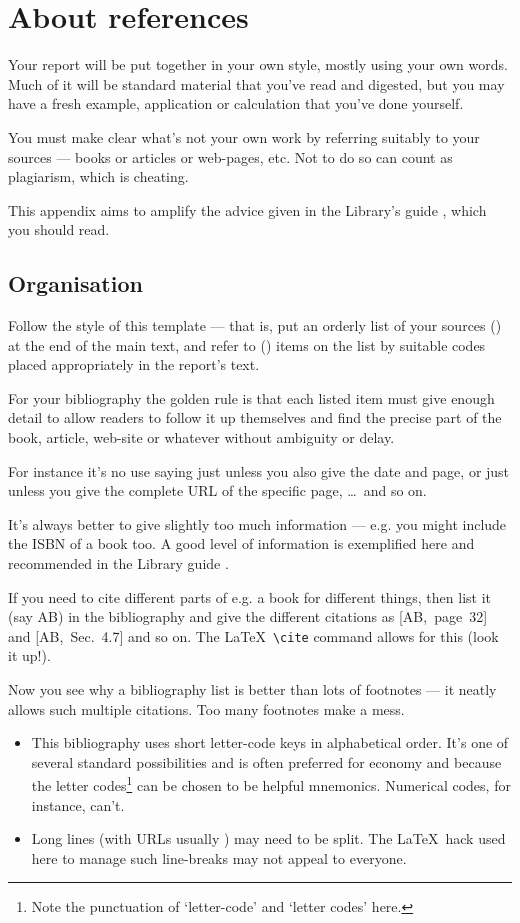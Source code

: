 \chapter{About references}\label{app:refs}
Your report will be put together in your own style, mostly using your
own words. Much of it will be standard material that you've read and
digested, but you may have a fresh example, application or calculation
that you've done yourself.
\par
You must make clear what's not your own work by referring suitably
to your sources --- books or articles or web-pages, etc. Not to do so
can count as plagiarism, which is cheating.
\par
This appendix aims to amplify the advice given in the
Library's guide \cite{BR}, which you should read.
\section{Organisation}
Follow the style of this template --- that is, put an orderly list of
your sources () at the end of the main text,
and refer to () items on the list by suitable codes placed
appropriately in the report's text.
\par
For your bibliography the golden rule is that each listed item must give
enough detail to allow readers to follow it up themselves and find the
precise part of the book, article, web-site or whatever without
ambiguity or delay.
\par
For instance it's no use saying just  unless
you also give the date and page, or just  unless you
give the complete URL of the specific page, \dots\ and so on.
\par
It's always better to give slightly too much information --- e.g. you
might include the ISBN of a book too. A good level of information is
exemplified here and recommended in the Library guide \cite{BR}.
\par
If you need to cite different parts of e.g. a book for different things,
then list it (say AB) in the bibliography and give the different
citations as [AB,~page~32] and [AB,~Sec.~4.7] and so on. The \LaTeX\
\verb+\cite+ command allows for this (look it up!).
\par
Now you see why a bibliography list is better than lots of footnotes
--- it neatly allows such multiple citations. Too many footnotes make a
mess.
\begin{itemize}\item This bibliography uses short letter-code
keys in alphabetical order. It's one of several standard possibilities
\cite{BR} and is often preferred for economy and because the letter
codes\footnote{Note the punctuation of \lq letter-code' and \lq letter
codes' here.} can be chosen to be helpful mnemonics. Numerical codes,
for instance, can't.
\item Long lines (with URLs usually \cite{IM,PS}) may need to be split.
The \LaTeX\ hack used here to manage such line-breaks may not appeal to
everyone.\end{itemize}
